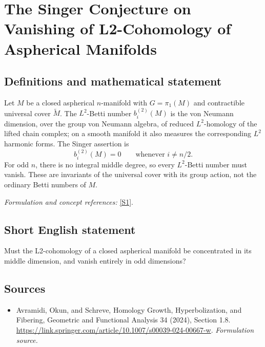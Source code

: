 \documentclass[11pt]{article}
\begin{document}
\section*{\texorpdfstring{The Singer Conjecture on Vanishing of L2-Cohomology of Aspherical Manifolds}{The Singer Conjecture on Vanishing of L2-Cohomology of Aspherical Manifolds}}\label{statement}
\subsection{Definitions and mathematical statement}
Let $M$ be a closed aspherical $n$-manifold with $G=\pi_1(M)$ and contractible universal cover $\widetilde M$. The $L^2$-Betti number $b_i^{(2)}(M)$ is the von Neumann dimension, over the group von Neumann algebra, of reduced $L^2$-homology of the lifted chain complex; on a smooth manifold it also measures the corresponding $L^2$ harmonic forms. The Singer assertion is
\[
 b_i^{(2)}(M)=0\qquad\text{whenever }i\ne n/2.
\]
For odd $n$, there is no integral middle degree, so every $L^2$-Betti number must vanish. These are invariants of the universal cover with its group action, not the ordinary Betti numbers of $M$.
\par\smallskip\textit{Formulation and concept references:} \href{https://link.springer.com/article/10.1007/s00039-024-00667-w}{[S1]}.

\subsection{Short English statement}
Must the L2-cohomology of a closed aspherical manifold be concentrated in its middle dimension, and vanish entirely in odd dimensions?
\subsection{Sources}
\begin{itemize}
\item[S1]Avramidi, Okun, and Schreve, Homology Growth, Hyperbolization, and Fibering, Geometric and Functional Analysis 34 (2024), Section 1.8.
\url{https://link.springer.com/article/10.1007/s00039-024-00667-w}.
\textit{Formulation source.}
\end{itemize}
\end{document}
